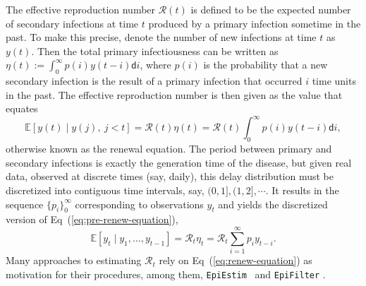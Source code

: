 \documentclass[10pt,letterpaper]{article}
\def\EpiEstim{\texttt{EpiEstim}}
\def\bbE{\mathbb{E}}
\def\calR{\mathcal{R}}
\def\diff{\mathsf{d}}
\newcommand{\citep}[1]{\cite{#1}}
\renewcommand{\eqref}[1]{Eq~(\ref{#1})}
\begin{document}
The effective reproduction number $\calR(t)$ is defined to be the expected
number of secondary infections at time $t$ produced by a primary infection
sometime in the past. To make this precise, denote the number of new infections
at time $t$ as $y(t)$. Then the total primary infectiousness can be written as
$\eta(t) := \int_0^{\infty} p(i) y(t-i) \diff i$, where $p(i)$ is the
probability that a new secondary infection is the result of a primary infection
that occurred $i$ time units in the past. The effective reproduction number is then given
as the value that equates
\begin{equation} \label{eq:pre-renew-equation}
  \bbE[y(t) \mid y(j),\ j<t]=\calR(t)\eta(t)=\calR(t)\int_0^\infty p(i)y(t-i)\diff i,
\end{equation}
otherwise known as the renewal equation. The period between primary and secondary
infections is exactly the generation time of the disease, but given real data,
observed at discrete times (say, daily), this delay distribution must be discretized
into contiguous time intervals,
say, $(0,1], (1,2], \cdots$. It results in the sequence $\{p_i\}_0^\infty$
corresponding to observations $y_t$ and yields the
discretized version of \eqref{eq:pre-renew-equation},
\begin{equation} \label{eq:renew-equation}
  \bbE[y_t \mid y_1,\ldots,y_{t-1}]=\calR_t\eta_t=\calR_t\sum_{i = 1}^\infty p_i y_{t-i}.
\end{equation}
Many approaches to estimating $\calR_t$ rely on \eqref{eq:renew-equation} as
motivation for their procedures, among them, \EpiEstim\ \citep{cori2013new} 
and \texttt{EpiFilter} \citep{parag2021improved}. 
\end{document}
